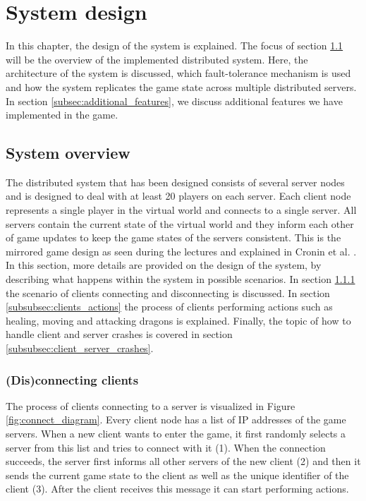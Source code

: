 \section{System design}
\label{sec:design}
In this chapter, the design of the system is explained. The focus of section \ref{subsec:system_overview} will be the overview of the implemented distributed system.
Here, the architecture of the system is discussed, which fault-tolerance mechanism is used and how the system replicates the game state across multiple distributed servers. 
In section \ref{subsec:additional_features}, we discuss additional features we have implemented in the game.

\subsection{System overview}
\label{subsec:system_overview}
The distributed system that has been designed consists of several server nodes and is designed to deal with at least 20 players on each server. 
Each client node represents a single player in the virtual world and connects to a single server.
All servers contain the current state of the virtual world and they inform each other of game updates to keep the game states of the servers consistent. 
This is the mirrored game design as seen during the lectures and explained in Cronin et al. \cite{cronin2002efficient}. 
In this section, more details are provided on the design of the system, by describing what happens within the system in possible scenarios. 
In section \ref{subsubsec:disconnecting_clients} the scenario of clients connecting and disconnecting is discussed. 
In section \ref{subsubsec:clients_actions} the process of clients performing actions such as healing, moving and attacking dragons is explained. 
Finally, the topic of how to handle client and server crashes is covered in section \ref{subsubsec:client_server_crashes}.

\subsubsection{(Dis)connecting clients}
\label{subsubsec:disconnecting_clients}
The process of clients connecting to a server is visualized in Figure \ref{fig:connect_diagram}. 
Every client node has a list of IP addresses of the game servers. When a new client wants to enter the game, it first randomly selects a server from this list and tries to connect with it (1). 
When the connection succeeds, the server first informs all other servers of the new client (2) and then it sends the current game state to the client as well as the unique identifier of the client (3). 
After the client receives this message it can start performing actions.


